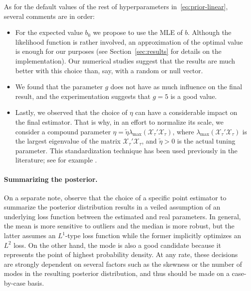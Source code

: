 As for the default values of the rest of hyperparameters in~\eqref{eq:prior-linear}, several comments are in order:
\begin{itemize}
  \item For the expected value \(b_0\) we propose to use the MLE of \(b\). Although the likelihood function is rather involved, an approximation of the optimal value is enough for our purposes (see Section~\ref{sec:results} for details on the implementation). Our numerical studies suggest that the results are much better with this choice than, say, with a random or null vector.
  \item We found that the parameter \(g\) does not have as much influence on the final result, and the experimentation suggests that \(g=5\) is a good value.
  \item Lastly, we observed that the choice of \(\eta\) can have a considerable impact on the final estimator. That is why, in an effort to normalize its scale, we consider a compound parameter \(\eta = \tilde \eta \lambda_{\max}(\mathcal X_\tau'\mathcal X_\tau)\), where \(\lambda_{\max}(\mathcal X_\tau'\mathcal X_\tau)\) is the largest eigenvalue of the matrix \(\mathcal X_\tau'\mathcal X_\tau\), and \(\tilde\eta > 0\) is the actual tuning parameter. This standardization technique has been used previously in the literature; see for example \citet{grollemund2019bayesian}.
\end{itemize}

\paragraph{Summarizing the posterior.} On a separate note, observe that the choice of a specific point estimator to summarize the posterior distribution results in a veiled assumption of an underlying loss function between the estimated and real parameters. In general, the mean is more sensitive to outliers and the median is more robust, but the latter assumes an \(L^1\)-type loss function while the former implicitly optimizes an \(L^2\) loss. On the other hand, the mode is also a good candidate because it represents the point of highest probability density. At any rate, these decisions are strongly dependent on several factors such as the skewness or the number of modes in the resulting posterior distribution, and thus should be made on a case-by-case basis. 

